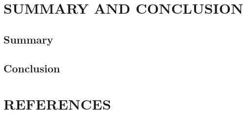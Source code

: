 \documentclass[11pt]{report}
\begin{document}
	
	
	
	
	
	
	
	
	
	
	
	
	
	
	
	
	
	
	
	
	
	
	
	
	
	
	
	\chapter{SUMMARY AND CONCLUSION}
	\section{Summary}
	
	
	\section{Conclusion}
	
	

	
	\chapter*{REFERENCES}
	
	\begin{description}
		\item 
	\end{description}
	
\end{document}
